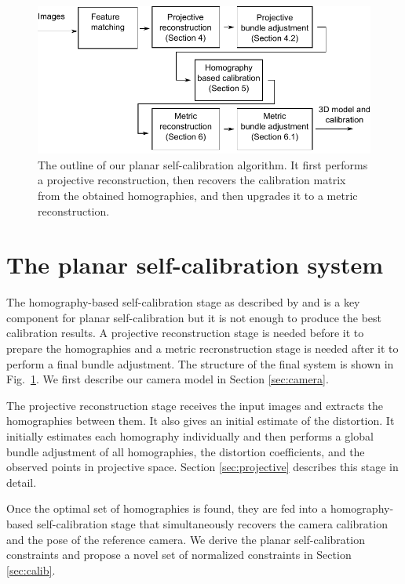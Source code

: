 \documentclass[10pt,twocolumn,letterpaper]{article}
\begin{document}
\begin{figure}
\includegraphics[width=\linewidth]{images/pipeline.pdf}
\caption{The outline of our planar self-calibration algorithm. It first performs a projective reconstruction, then recovers the calibration matrix from the obtained homographies, and then upgrades it to a metric reconstruction.}
\label{fig:diagram}
\end{figure}

\section{The planar self-calibration system}

The homography-based self-calibration stage as described by \cite{bocquillon2006} and \cite{gurdjos2003} is a key component for planar self-calibration but it is not enough to produce the best calibration results. A projective reconstruction stage is needed before it to prepare the homographies and a metric recronstruction stage is needed after it to perform a final bundle adjustment. The structure of the final system is shown in Fig.~\ref{fig:diagram}. We first describe our camera model in Section \ref{sec:camera}.

The projective reconstruction stage receives the input images and extracts the homographies between them. It also gives an initial estimate of the distortion. It initially estimates each homography individually and then performs a global bundle adjustment of all homographies, the distortion coefficients, and the observed points in projective space. Section \ref{sec:projective} describes this stage in detail.

Once the optimal set of homographies is found, they are fed into a homography-based self-calibration stage that simultaneously recovers the camera calibration and the pose of the reference camera. We derive the planar self-calibration constraints and propose a novel set of normalized constraints in Section \ref{sec:calib}.
\end{document}
